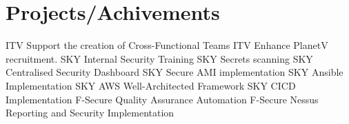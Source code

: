 \documentclass[]{twentysecondcv}
\begin{document}
\section{Projects/Achivements}
\begin{twentyshort}
  \twentyitemshort
    {ITV}
    {Support the creation of Cross-Functional Teams}
  \twentyitemshort
    {ITV}
    {Enhance PlanetV recruitment.}
  \twentyitemshort
    {SKY}
    {Internal Security Training}
  \twentyitemshort
    {SKY}
    {Secrets scanning}
  \twentyitemshort
    {SKY}
    {Centralised Security Dashboard}
  \twentyitemshort
    {SKY}
    {Secure AMI implementation}
  \twentyitemshort
    {SKY}
    {Ansible Implementation}
  \twentyitemshort
    {SKY}
    {AWS Well-Architected Framework}
  \twentyitemshort
    {SKY}
    {CICD Implementation}
  \twentyitemshort
    {F-Secure}
    {Quality Assurance Automation}
  \twentyitemshort
    {F-Secure}
    {Nessus Reporting and Security Implementation}
\end{twentyshort}




\end{document}
